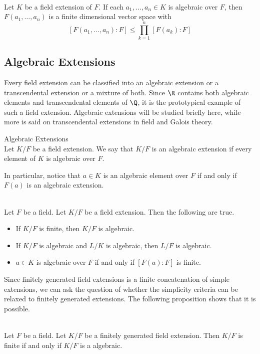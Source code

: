 \documentclass[a4paper]{article}
\begin{document}
\begin{prp}{}{}\\
Let $K$ be a field extension of $F$. If each $a_1,\dots,a_n\in K$ is algebraic over $F$, then $F(a_1,\dots,a_n)$ is a finite dimensional vector space with $$[F(a_1,\dots,a_n):F]\leq\prod_{k=1}^n[F(a_k):F]$$
\end{prp}

\subsection{Algebraic Extensions}
Every field extension can be classified into an algebraic extension or a transcendental extension or a mixture of both. Since $\R$ contains both algebraic elements and transcendental elements of $\Q$, it is the prototypical example of such a field extension. Algebraic extensions will be studied briefly here, while more is said on transcendental extensions in field and Galois theory. 

\begin{defn}{Algebraic Extensions}{}\\
Let $K/F$ be a field extension. We say that $K/F$ is an algebraic extension if every element of $K$ is algebraic over $F$. 
\end{defn}

In particular, notice that $a\in K$ is an algebraic element over $F$ if and only if $F(a)$ is an algebraic extension. 

\begin{prp}{}{}\\
Let $F$ be a field. Let $K/F$ be a field extension. Then the following are true. 
\begin{itemize}
\item If $K/F$ is finite, then $K/F$ is algebraic. 
\item If $K/F$ is algebraic and $L/K$ is algebraic, then $L/F$ is algebraic. 
\item $a\in K$ is algebraic over $F$ if and only if $[F(a):F]$ is finite. 
\end{itemize}
\end{prp}

Since finitely generated field extensions is a finite concatenation of simple extensions, we can ask the question of whether the simplicity criteria can be relaxed to finitely generated extensions. The following proposition shows that it is possible. 

\begin{prp}{}{}\\
Let $F$ be a field. Let $K/F$ be a finitely generated field extension. Then $K/F$ is finite if and only if $K/F$ is a algebraic. 
\end{prp}
\end{document}
